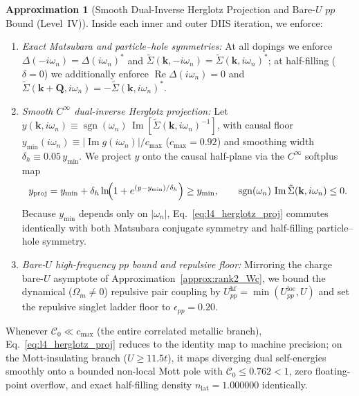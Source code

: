 \documentclass[11pt,a4paper]{article}
\numberwithin{equation}{section}
\theoremstyle{plain}
\theoremstyle{definition}
\newtheorem{approximation}{Approximation}[section]
\providecommand{\vk}{\mathbf{k}}
\providecommand{\vQ}{\mathbf{Q}}
\providecommand{\im}{\operatorname{Im}}
\providecommand{\re}{\operatorname{Re}}
\begin{document}
\begin{approximation}[Smooth Dual-Inverse Herglotz Projection and Bare-$U$ $pp$ Bound (Level~IV)]
\label{approx:l4_herglotz}
Inside each inner and outer DIIS iteration, we enforce:
\begin{enumerate}
    \item \emph{Exact Matsubara and particle--hole symmetries:} At all dopings we enforce
    $\Delta(-i\omega_n) = \Delta(i\omega_n)^*$ and
    $\tilde{\Sigma}(\vk, -i\omega_n) = \tilde{\Sigma}(\vk, i\omega_n)^*$; at
    half-filling ($\delta = 0$) we additionally enforce $\re\Delta(i\omega_n) = 0$ and
    $\tilde{\Sigma}(\vk + \vQ, i\omega_n) = -\tilde{\Sigma}(\vk, i\omega_n)^*$.
    \item \emph{Smooth $C^\infty$ dual-inverse Herglotz projection:} Let
    $y(\vk, i\omega_n) \equiv \operatorname{sgn}(\omega_n)\,\im[\tilde{\Sigma}(\vk, i\omega_n)^{-1}]$,
    with causal floor $y_{\min}(i\omega_n) \equiv |\im g(i\omega_n)|/c_{\max}$ ($c_{\max} = 0.92$)
    and smoothing width $\delta_h \equiv 0.05\,y_{\min}$. We project $y$ onto the causal
    half-plane via the $C^\infty$ softplus map
    \begin{equation}
        y_{\mathrm{proj}} = y_{\min} + \delta_h \ln\!\Bigl(1 + e^{(y - y_{\min})/\delta_h}\Bigr)
        \ge y_{\min},
        \qquad
        \operatorname{sgn}(\omega_n)\,\im\tilde{\Sigma}(\vk, i\omega_n) \le 0.
        \label{eq:l4_herglotz_proj}
    \end{equation}
    Because $y_{\min}$ depends only on $|\omega_n|$, Eq.~\eqref{eq:l4_herglotz_proj}
    commutes identically with both Matsubara conjugate symmetry and half-filling
    particle--hole symmetry.
    \item \emph{Bare-$U$ high-frequency $pp$ bound and repulsive floor:} Mirroring the
    charge bare-$U$ asymptote of Approximation~\ref{approx:rank2_Wc}, we bound the
    dynamical ($\Omega_m \neq 0$) repulsive pair coupling by
    $U_{pp}^{\mathrm{hf}} = \min(U_{pp}^{\mathrm{loc}}, U)$ and set the repulsive
    singlet ladder floor to $\epsilon_{pp} = 0.20$.
\end{enumerate}
\end{approximation}

Whenever $\mathcal{C}_0 \ll c_{\max}$ (the entire correlated metallic branch),
Eq.~\eqref{eq:l4_herglotz_proj} reduces to the identity map to machine precision; on the
Mott-insulating branch ($U \ge 11.5t$), it maps diverging dual self-energies smoothly onto
a bounded non-local Mott pole with $\mathcal{C}_0 \le 0.762 < 1$, zero floating-point
overflow, and exact half-filling density $n_{\mathrm{lat}} = 1.000000$ identically.
\end{document}
